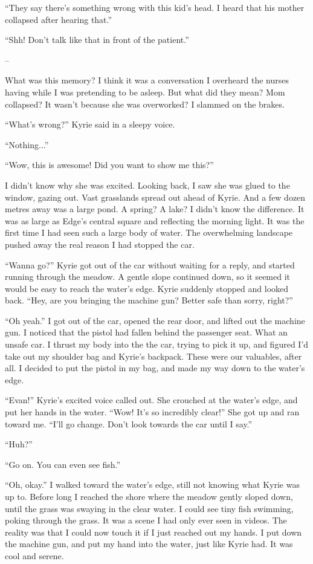 \documentclass[oneside]{book}
\begin{document}
“They say there’s something wrong with this kid’s head. I heard that his mother collapsed after hearing that.”

“Shh! Don’t talk like that in front of the patient.”

–

What was this memory? I think it was a conversation I overheard the nurses having while I was pretending to be asleep. But what did they mean? Mom collapsed? It wasn’t because she was overworked? I slammed on the brakes.

“What’s wrong?” Kyrie said in a sleepy voice.

“Nothing...”

“Wow, this is awesome! Did you want to show me this?”

I didn’t know why she was excited. Looking back, I saw she was glued to the window, gazing out. Vast grasslands spread out ahead of Kyrie. And a few dozen metres away was a large pond. A spring? A lake? I didn’t know the difference. It was as large as Edge’s central square and reflecting the morning light. It was the first time I had seen such a large body of water. The overwhelming landscape pushed away the real reason I had stopped the car.

“Wanna go?” Kyrie got out of the car without waiting for a reply, and started running through the meadow. A gentle slope continued down, so it seemed it would be easy to reach the water’s edge. Kyrie suddenly stopped and looked back. “Hey, are you bringing the machine gun? Better safe than sorry, right?”

“Oh yeah.” I got out of the car, opened the rear door, and lifted out the machine gun. I noticed that the pistol had fallen behind the passenger seat. What an unsafe car. I thrust my body into the the car, trying to pick it up, and figured I’d take out my shoulder bag and Kyrie’s backpack. These were our valuables, after all. I decided to put the pistol in my bag, and made my way down to the water’s edge.

“Evan!” Kyrie’s excited voice called out. She crouched at the water’s edge, and put her hands in the water. “Wow! It’s so incredibly clear!” She got up and ran toward me. “I’ll go change. Don’t look towards the car until I say.”

“Huh?”

“Go on. You can even see fish.”

“Oh, okay.” I walked toward the water’s edge, still not knowing what Kyrie was up to. Before long I reached the shore where the meadow gently sloped down, until the grass was swaying in the clear water. I could see tiny fish swimming, poking through the grass. It was a scene I had only ever seen in videos. The reality was that I could now touch it if I just reached out my hands. I put down the machine gun, and put my hand into the water, just like Kyrie had. It was cool and serene.
\end{document}
